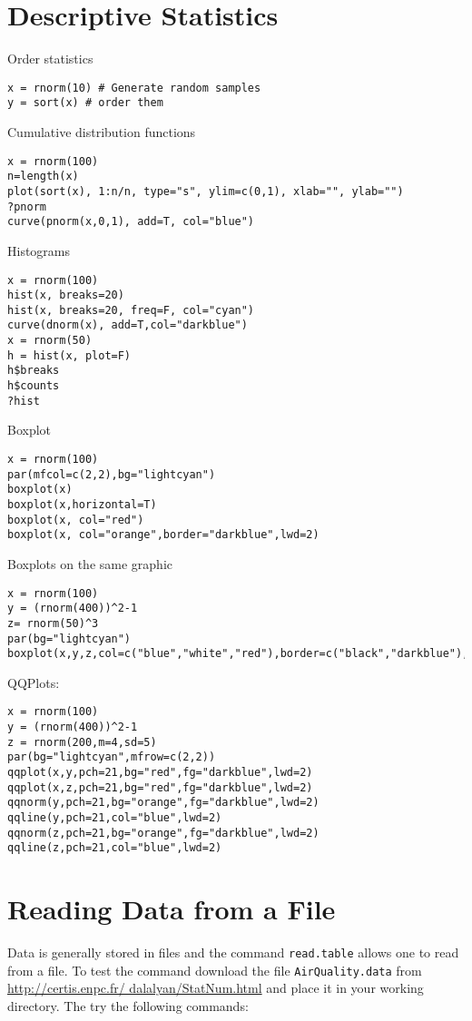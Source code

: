 \documentclass[a4paper,10pt]{article}
\begin{document}
\section{Descriptive Statistics}\label{sec:desc}

Order statistics 
\begin{lstlisting} 
x = rnorm(10) # Generate random samples 
y = sort(x) # order them 
\end{lstlisting}

\noindent
Cumulative distribution functions 
\begin{lstlisting}
x = rnorm(100)
n=length(x)
plot(sort(x), 1:n/n, type="s", ylim=c(0,1), xlab="", ylab="")
?pnorm
curve(pnorm(x,0,1), add=T, col="blue")
\end{lstlisting}

\noindent
Histograms 
\begin{lstlisting}
x = rnorm(100)
hist(x, breaks=20)
hist(x, breaks=20, freq=F, col="cyan")
curve(dnorm(x), add=T,col="darkblue")
x = rnorm(50)
h = hist(x, plot=F)
h$breaks
h$counts
?hist
\end{lstlisting}
\noindent
Boxplot
\begin{lstlisting}
x = rnorm(100)
par(mfcol=c(2,2),bg="lightcyan")
boxplot(x)
boxplot(x,horizontal=T)
boxplot(x, col="red")
boxplot(x, col="orange",border="darkblue",lwd=2)
\end{lstlisting}

\noindent
Boxplots on the same graphic 
\begin{lstlisting}
x = rnorm(100)
y = (rnorm(400))^2-1
z= rnorm(50)^3
par(bg="lightcyan")
boxplot(x,y,z,col=c("blue","white","red"),border=c("black","darkblue"),lwd=1.5)
\end{lstlisting}

\noindent
QQPlots: 
\begin{lstlisting}
x = rnorm(100)
y = (rnorm(400))^2-1
z = rnorm(200,m=4,sd=5)
par(bg="lightcyan",mfrow=c(2,2))
qqplot(x,y,pch=21,bg="red",fg="darkblue",lwd=2)
qqplot(x,z,pch=21,bg="red",fg="darkblue",lwd=2)
qqnorm(y,pch=21,bg="orange",fg="darkblue",lwd=2)
qqline(y,pch=21,col="blue",lwd=2)
qqnorm(z,pch=21,bg="orange",fg="darkblue",lwd=2)
qqline(z,pch=21,col="blue",lwd=2)
\end{lstlisting}

\section{Reading Data from a File} 

Data is generally stored in files and the command \texttt{read.table} allows one to read from a file. To test the command download the file \texttt{AirQuality.data} from \url{http://certis.enpc.fr/ dalalyan/StatNum.html} and place it in your working directory. The try the following commands: 
\end{document}
